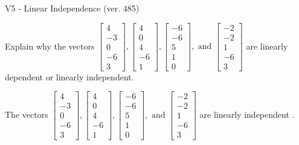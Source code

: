 \begin{exercise}
  \begin{exerciseTitle}V5 - Linear Independence (ver. 485)\end{exerciseTitle}
  \begin{exerciseStatement}
    Explain why the vectors \(\left[\begin{array}{r}
4 \\
-3 \\
0 \\
-6 \\
3
\end{array}\right] , \left[\begin{array}{r}
4 \\
0 \\
4 \\
-6 \\
1
\end{array}\right] , \left[\begin{array}{r}
-6 \\
-6 \\
5 \\
1 \\
0
\end{array}\right] , \text{ and } \left[\begin{array}{r}
-2 \\
-2 \\
1 \\
-6 \\
3
\end{array}\right]\) are linearly dependent or linearly independent.	


  \end{exerciseStatement}
  \begin{exerciseAnswer}
   The vectors \(\left[\begin{array}{r}
4 \\
-3 \\
0 \\
-6 \\
3
\end{array}\right] , \left[\begin{array}{r}
4 \\
0 \\
4 \\
-6 \\
1
\end{array}\right] , \left[\begin{array}{r}
-6 \\
-6 \\
5 \\
1 \\
0
\end{array}\right] , \text{ and } \left[\begin{array}{r}
-2 \\
-2 \\
1 \\
-6 \\
3
\end{array}\right]\) are 
  	 linearly independent  .
  


  \end{exerciseAnswer}
\end{exercise}